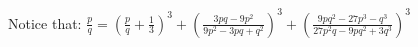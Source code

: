 \documentclass[preview]{standalone}
\begin{document}
\begin{center}
Notice that: $ \frac{p}{q} = \left( \frac{p}{q} + \frac{1}{3} \right)^3 + \left( \frac{3pq - 9p^2}{9p^2 - 3pq + q^2} \right)^3 + \left( \frac{9pq^2 - 27p^3 - q^3}{27p^2q - 9pq^2 + 3q^3} \right)^3 $
\end{center}
\end{document}
